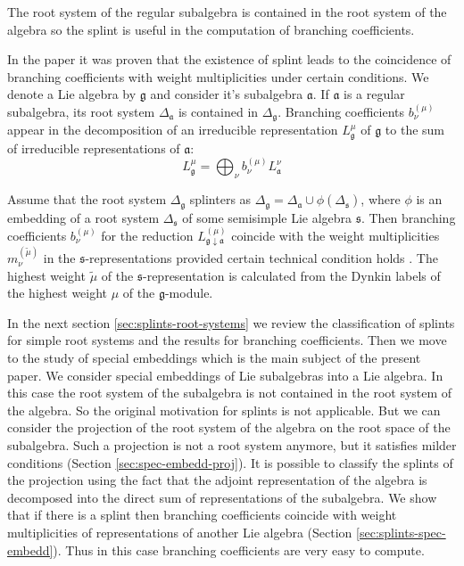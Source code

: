 \documentclass[12pt]{iopart}
\newcommand{\gf}{\mathfrak{g}}
\newcommand{\af}{\mathfrak{a}}
\newcommand{\sfr}{\mathfrak{s}}
\begin{document}
The root system of the regular subalgebra is contained in the root system of the algebra so the splint is useful in the
computation of branching coefficients. 

In the paper \cite{2011arXiv1111.6787L} it was proven that the existence of splint leads to the
coincidence of branching coefficients with weight multiplicities under certain conditions. We denote a
Lie algebra by $\gf$ and consider it's subalgebra $\af$. If $\af$ is a regular subalgebra, its root
system $\Delta_{\af}$ is contained in $\Delta_{\gf}$. Branching coefficients $b^{(\mu)}_{\nu}$
appear in the decomposition of an irreducible representation $L^{\mu}_{\gf}$ of $\gf$ to the sum of
irreducible representations of $\af$:
\begin{equation}
  \label{eq:1}
  L^{\mu}_{\gf}=\bigoplus_{\nu} b^{(\mu)}_{\nu} L^{\nu}_{\af}
\end{equation}

Assume that the root system $\Delta_{\gf}$ splinters as $\Delta_{\gf}=\Delta_{\af} \cup
\phi(\Delta_{\sfr})$, where $\phi$ is an embedding of a root system $\Delta_{\sfr}$ of some semisimple
Lie algebra $\sfr$. Then branching coefficients $b^{(\mu)}_{\nu}$ for the reduction
$L^{(\mu)}_{\gf\downarrow \af}$ coincide with the weight multiplicities $m^{(\tilde \mu)}_{\nu}$ in the $\sfr$-representations provided certain technical condition holds \cite{2011arXiv1111.6787L}.
The highest weight $\tilde\mu$ of the $\sfr$-representation is calculated from the Dynkin labels of the highest
weight $\mu$ of the $\gf$-module.


In the next section \ref{sec:splints-root-systems} we review the classification of splints for simple
root systems and the results for branching coefficients. Then we move to the study of special embeddings
which is the main subject of the present paper. We consider special embeddings of Lie subalgebras
into a Lie algebra. In this case the root system of the subalgebra is not contained in the root system of
the algebra. So the original motivation for splints is not applicable. But we can consider the
projection of the root system of the algebra on the root space of the subalgebra. Such a projection is not a
root system anymore, but it satisfies milder conditions (Section \ref{sec:spec-embedd-proj}). It is
possible to classify the splints of the projection using the fact that the adjoint representation of the algebra is decomposed into the direct sum of representations of the subalgebra. We show that if there is a splint then branching coefficients coincide with weight multiplicities of representations of another Lie algebra (Section \ref{sec:splints-spec-embedd}). Thus in this case branching coefficients are very easy to compute.
\end{document}
